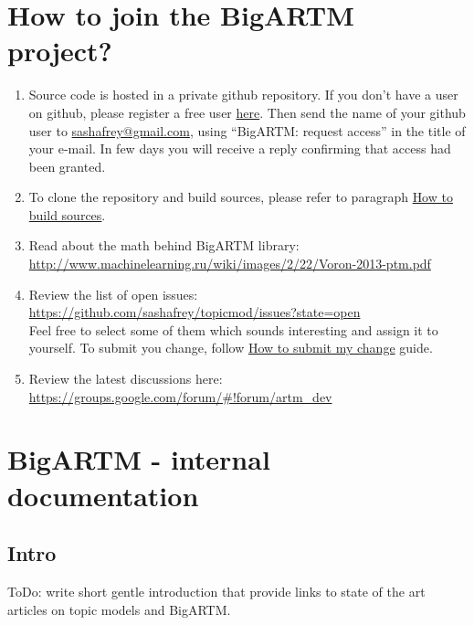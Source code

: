 \documentclass[11pt,a4paper,twoside]{report}
\begin{document}
\tableofcontents

\chapter{How to join the BigARTM project?}
\begin{enumerate}
\item Source code is hosted in a private github repository.
    If you don't have a user on github, please register a free user \href{https://github.com/}{here}.
    Then send the name of your github user to \href{mailto:sashafrey@gmail.com}{sashafrey@gmail.com},
    using ``BigARTM: request access'' in the title of your e-mail.
    In few days you will receive a reply confirming that access had been granted.
\item To clone the repository and build sources, please refer to paragraph
    \hyperref[label:how_to_build]{How to build sources}.
\item Read about the math behind BigARTM library: \\ \url{http://www.machinelearning.ru/wiki/images/2/22/Voron-2013-ptm.pdf}
\item Review the list of open issues: \\
    \url{https://github.com/sashafrey/topicmod/issues?state=open}\\
    Feel free to select some of them which sounds interesting and assign it to yourself.
    To submit you change, follow \hyperref[label:how_to_submit]{How to submit my change} guide.
\item Review the latest discussions here: \\
    \url{https://groups.google.com/forum/#!forum/artm_dev}
\end{enumerate}

\chapter{BigARTM - internal documentation}

\section{Intro}
ToDo: write short gentle introduction that provide links to state of the art articles on topic models and BigARTM.
\end{document}
